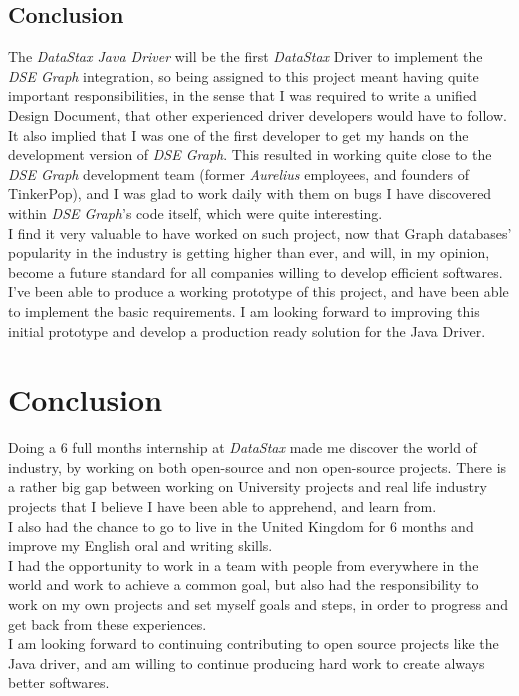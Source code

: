 \documentclass[a4paper]{report}
\newcommand{\ds}{\emph{DataStax\xspace}}
\newcommand{\djd}{\emph{DataStax Java Driver\xspace}}
\begin{document}
\section{Conclusion}
The \djd{} will be the first \ds{} Driver to implement the \emph{DSE Graph} integration, so being assigned to this project meant having quite important responsibilities, in the sense that I was required to write a unified Design Document, that other experienced driver developers would have to follow. It also implied that I was one of the first developer to get my hands on the development version of \emph{DSE Graph}. This resulted in working quite close to the \emph{DSE Graph} development team (former \emph{Aurelius} employees, and founders of TinkerPop), and I was glad to work daily with them on bugs I have discovered within \emph{DSE Graph}'s code itself, which were quite interesting.\\
I find it very valuable to have worked on such project, now that Graph databases' popularity in the industry is getting higher than ever, and will, in my opinion, become a future standard for all companies willing to develop efficient softwares.\\
I've been able to produce a working prototype of this project, and have been able to implement the basic requirements. I am looking forward to improving this initial prototype and develop a production ready solution for the Java Driver.

\chapter{Conclusion}
Doing a 6 full months internship at \emph{DataStax} made me discover the world of industry, by working on both open-source and non open-source projects. There is a rather big gap between working on University projects and real life industry projects that I believe I have been able to apprehend, and learn from.\\
I also had the chance to go to live in the United Kingdom for 6 months and improve my English oral and writing skills.\\
I had the opportunity to work in a team with people from everywhere in the world and work to achieve a common goal, but also had the responsibility to work on my own projects and set myself goals and steps, in order to progress and get back from these experiences.\\
I am looking forward to continuing contributing to open source projects like the Java driver, and am willing to continue producing hard work to create always better softwares.



\end{document}
